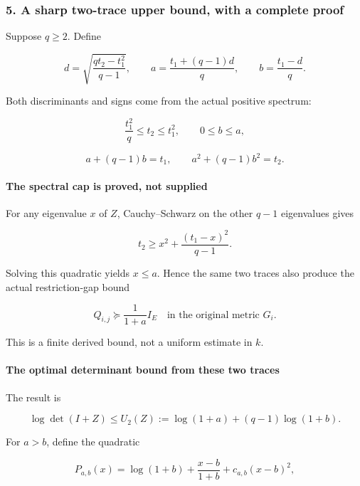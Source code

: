 \subsubsection{5. A sharp two-trace upper bound, with a complete proof}\label{endpoint-relation_moment_original--a-sharp-two-trace-upper-bound-with-a-complete-proof}

Suppose \(q\ge2\). Define

\[
 d=\sqrt{\frac{qt_2-t_1^2}{q-1}},\qquad
 a=\frac{t_1+(q-1)d}{q},\qquad
 b=\frac{t_1-d}{q}.                                            \tag{16}
\]

Both discriminants and signs come from the actual positive spectrum:

\[
 \frac{t_1^2}{q}\le t_2\le t_1^2,
 \qquad 0\le b\le a,
\]

\[
 a+(q-1)b=t_1,\qquad a^2+(q-1)b^2=t_2.                         \tag{17}
\]

\paragraph{The spectral cap is proved, not supplied}\label{endpoint-relation_moment_original--the-spectral-cap-is-proved-not-supplied}

For any eigenvalue \(x\) of \(Z\), Cauchy--Schwarz on the other \(q-1\) eigenvalues gives

\[
 t_2\ge x^2+\frac{(t_1-x)^2}{q-1}.
\]

Solving this quadratic yields \(x\le a\). Hence the same two traces also produce the actual restriction-gap bound

\[
 \boxed{Q_{i,j}\succeq\frac1{1+a}I_E
 \quad\text{in the original metric }G_i.}                      \tag{18}
\]

This is a finite derived bound, not a uniform estimate in \(k\).

\paragraph{The optimal determinant bound from these two traces}\label{endpoint-relation_moment_original--the-optimal-determinant-bound-from-these-two-traces}

The result is

\[
 \boxed{
 \log\det(I+Z)\le U_2(Z):=\log(1+a)+(q-1)\log(1+b).
 }                                                             \tag{19}
\]

For \(a>b\), define the quadratic

\[
 P_{a,b}(x)=\log(1+b)+\frac{x-b}{1+b}+c_{a,b}(x-b)^2,
\]


